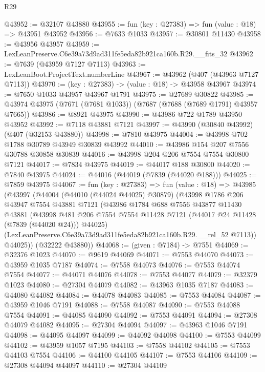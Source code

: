 \begin{lexlean}{R29}
\begin{coremodule}
@43952 := @32107 @43880
@43955 := fun (key : @27383) => fun (value : @18) => @43951 @43952
@43956 := @7633 @1033
@43957 := @30801 @11430
@43958 := @43956 @43957
@43959 := LexLeanPreserve.C6e39a73d9ad311fe5eda82b921ca160b.R29.__fits_32
@43962 := @7639 (@43959 @7127 @7113)
@43963 := LexLeanBoot.ProjectText.numberLine
@43967 := @43962 (@407 (@43963 @7127 @7113))
@43970 := (key : @27383) -> (value : @18) -> @43958 @43967
@43974 := @7650 @1033 @43957 @43967 @1791
@43975 := @27689 @30822
@43985 := @43974 @43975 (@7671 (@7681 @1033)) (@7687 (@7688 (@7689 @1791) @43957 @7665))
@43986 := @8921 @43975
@43990 := @43986 @722 @1789 @43950 @43952
@43992 := @7118 @43881 @7121
@43997 := @43990 (@30840 @43992) (@407 (@32153 @43880))
@43998 := @7810 @43975
@44004 := @43998 @702 @1788 @30789 @43949 @30839 @43992
@44010 := @43986 @154 @207 @7556 @30788 @30858 @30839
@44016 := @43998 @204 @206 @7554 @7554 @30800 @7121
@44017 := @7834 @43975
@44019 := @44017 @188 @30800
@44020 := @7840 @43975
@44024 := @44016 (@44019 (@7839 (@44020 @188)))
@44025 := @7859 @43975
@44067 := fun (key : @27383) =>
  fun (value : @18) =>
  @43985
    (@43997
      (@44004
        (@44010 (@44024 @44025) @30879)
        (@43998
          @1786
          @206
          @43947
          @7554
          @43881
          @7121
          (@43986
            @1784
            @688
            @7556
            @43877
            @11430
            @43881
            (@43998
              @481
              @206
              @7554
              @7554
              @11428
              @7121
              (@44017 @24 @11428 (@7839 (@44020 @24)))
              @44025)
            (LexLeanPreserve.C6e39a73d9ad311fe5eda82b921ca160b.R29.__rel_52 @7113))
          @44025))
      (@32222 @43880))
@44068 := (given : @7184) -> @7551
@44069 := @32376 @1023
@44070 := @9619 @44069
@44071 := @7553 @44070
@44073 := @43959 @1035 @7187
@44074 := @7558 @44073
@44076 := @7553 @44074 @7554
@44077 := @44071 @44076
@44078 := @7553 @44077
@44079 := @32379 @1023
@44080 := @27304 @44079
@44082 := @43963 @1035 @7187
@44083 := @44080 @44082
@44084 := @44078 @44083
@44085 := @7553 @44084
@44087 := @43959 @1046 @7191
@44088 := @7558 @44087
@44090 := @7553 @44088 @7554
@44091 := @44085 @44090
@44092 := @7553 @44091
@44094 := @27308 @44079 @44082
@44095 := @27304 @44094
@44097 := @43963 @1046 @7191
@44098 := @44095 @44097
@44099 := @44092 @44098
@44100 := @7553 @44099
@44102 := @43959 @1057 @7195
@44103 := @7558 @44102
@44105 := @7553 @44103 @7554
@44106 := @44100 @44105
@44107 := @7553 @44106
@44109 := @27308 @44094 @44097
@44110 := @27304 @44109

\end{coremodule}
\end{lexlean}
